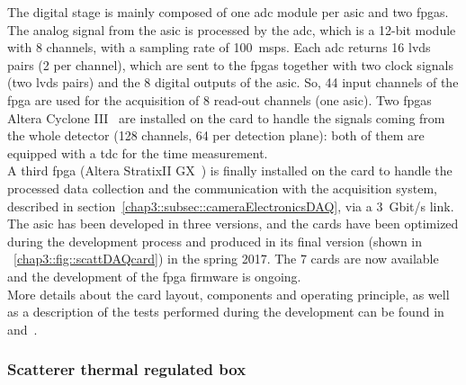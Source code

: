The digital stage is mainly composed of one \gls{adc} module per \gls{asic} and two \glspl{fpga}. The analog signal from the \gls{asic} is processed by the \gls{adc}, which is a 12-bit module with 8 channels, with a sampling rate of 100~\gls{msps}. Each \gls{adc} returns 16 \gls{lvds} pairs (2 per channel), which are sent to the \glspl{fpga} together with two clock signals (two \gls{lvds} pairs) and the 8 digital outputs of the \gls{asic}. So, 44 input channels of the \gls{fpga} are used for the acquisition of 8 read-out channels (one \gls{asic}). Two \glspl{fpga} Altera Cyclone III~\parencite{Altera2012} are installed on the card to handle the signals coming from the whole detector (128 channels, 64 per detection plane): both of them are equipped with a \gls{tdc} for the time measurement.\\
A third \gls{fpga} (Altera StratixII GX~\parencite{Altera2009}) is finally installed on the card to handle the processed data collection and the communication with the acquisition system, described in section~\ref{chap3::subsec::cameraElectronicsDAQ}, via a 3~Gbit/s link.\\
The \gls{asic} has been developed in three versions, and the cards have been optimized during the development process and produced in its final version (shown in \figurename~\ref{chap3::fig::scattDAQcard}) in the spring 2017. The 7 cards are now available and the development of the \gls{fpga} firmware is ongoing.\\
More details about the card layout, components and operating principle, as well as a description of the tests performed during the development can be found in~\cite{Chen2017} and~\cite{Dahoumane2012}.    

\subsubsection{Scatterer thermal regulated box}\label{chap3::subsubsec::ScattThermBox}

